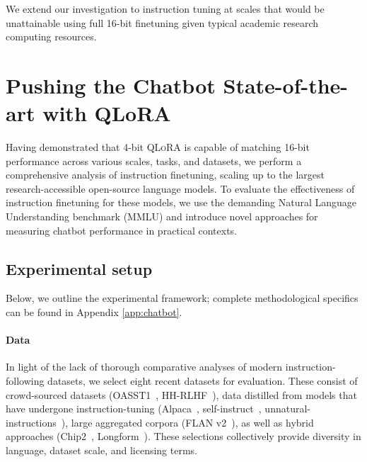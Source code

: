 We extend our investigation to instruction tuning at scales that would be unattainable using full 16-bit finetuning given typical academic research computing resources.

\section{Pushing the Chatbot State-of-the-art with QLoRA}
\label{sec:pushing}
Having demonstrated that 4-bit \textsc{QLoRA} is capable of matching 16-bit performance across various scales, tasks, and datasets, we perform a comprehensive analysis of instruction finetuning, scaling up to the largest research-accessible open-source language models. To evaluate the effectiveness of instruction finetuning for these models, we use the demanding Natural Language Understanding benchmark (MMLU) and introduce novel approaches for measuring chatbot performance in practical contexts.

\subsection{Experimental setup} Below, we outline the experimental framework; complete methodological specifics can be found in Appendix \ref{app:chatbot}.

\paragraph{Data} In light of the lack of thorough comparative analyses of modern instruction-following datasets, we select eight recent datasets for evaluation. These consist of crowd-sourced datasets (OASST1~\citep{kopf2023openassistant}, HH-RLHF~\citep{bai2022training}), data distilled from models that have undergone instruction-tuning (Alpaca~\citep{alpaca}, self-instruct~\citep{wang2022self}, unnatural-instructions~\citep{honovich2022unnatural}), large aggregated corpora (FLAN v2~\citep{chung2022scaling}), as well as hybrid approaches (Chip2~\citep{laion2023}, Longform~\citep{koksal2023longform}). These selections collectively provide diversity in language, dataset scale, and licensing terms.

